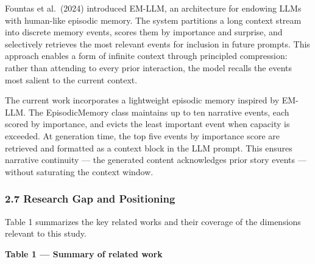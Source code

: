 Fountas et al.~(2024) introduced EM-LLM, an architecture for endowing
LLMs with human-like episodic memory. The system partitions a long
context stream into discrete memory events, scores them by importance
and surprise, and selectively retrieves the most relevant events for
inclusion in future prompts. This approach enables a form of infinite
context through principled compression: rather than attending to every
prior interaction, the model recalls the events most salient to the
current context.

The current work incorporates a lightweight episodic memory inspired by
EM-LLM. The EpisodicMemory class maintains up to ten narrative events,
each scored by importance, and evicts the least important event when
capacity is exceeded. At generation time, the top five events by
importance score are retrieved and formatted as a context block in the
LLM prompt. This ensures narrative continuity --- the generated content
acknowledges prior story events --- without saturating the context
window.

\subsubsection{2.7 Research Gap and
Positioning}\label{research-gap-and-positioning}

Table 1 summarizes the key related works and their coverage of the
dimensions relevant to this study.

\textbf{Table 1 --- Summary of related work}

